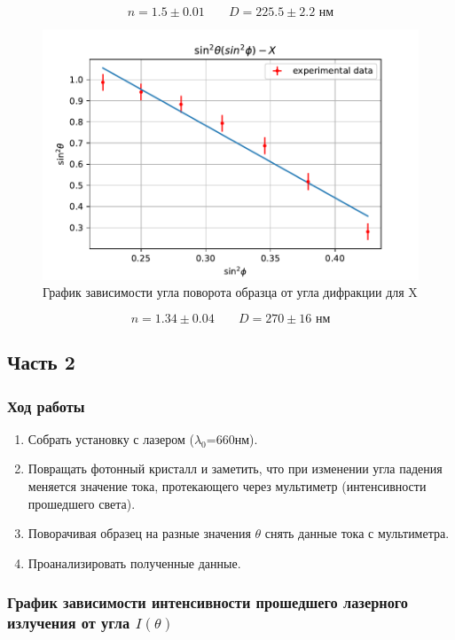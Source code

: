 \documentclass[a4paper, 12pt]{article}
\begin{document}
\begin{equation}
n = 1.5\pm 0.01\;\;\;\;\;\;\; D = 225.5 \pm 2.2  \text{ нм}
\end{equation}


\begin{figure}[H]
	\centering
	\includegraphics[scale=0.8]{X_red_1_sin}
	\caption{График зависимости угла поворота образца от угла дифракции для X}
	\label{im:11}
\end{figure}

\begin{equation}
n = 1.34\pm 0.04 \;\;\;\;\;\;\; D = 270 \pm 16 \text{ нм}
\end{equation}


\subsection{Часть 2}
\subsubsection{Ход работы}
\begin{enumerate}
\item Собрать установку с лазером ($\lambda_0$=660нм).
\item Повращать фотонный кристалл и заметить, что при изменении угла падения меняется значение тока, протекающего через мультиметр (интенсивности прошедшего света).
\item Поворачивая образец на разные значения $\theta$ снять данные тока с мультиметра.
\item Проанализировать полученные данные.
\end{enumerate}

\subsubsection{График зависимости интенсивности прошедшего лазерного излучения от угла $I(\theta)$}
\end{document}
